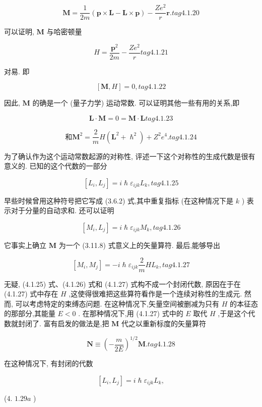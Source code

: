 $$
\mathbf{M} = \frac{1}{2m}\left( {\mathbf{p} \times \mathbf{L} - \mathbf{L} \times \mathbf{p}}\right) - \frac{Z{e}^{2}}{r}\mathbf{r}. tag{4. 1.20}
$$

可以证明, $\mathbf{M}$ 与哈密顿量

$$
H = \frac{{\mathbf{p}}^{2}}{2m} - \frac{Z{e}^{2}}{r} tag{4. 1.21}
$$

对易. 即

$$
\left\lbrack {\mathbf{M}, H}\right\rbrack = 0, tag{4. 1.22}
$$

因此, $\mathbf{M}$ 的确是一个 (量子力学) 运动常数. 可以证明其他一些有用的关系,即

$$
\mathbf{L} \cdot \mathbf{M} = 0 = \mathbf{M} \cdot \mathbf{L} tag{4. 1.23}
$$

$$
\text{和}{\mathbf{M}}^{2} = \frac{2}{m}H\left( {{\mathbf{L}}^{2} + {\hslash }^{2}}\right) + {Z}^{2}{e}^{4}\text{.} tag{4. 1.24}
$$

为了确认作为这个运动常数起源的对称性, 评述一下这个对称性的生成代数是很有意义的. 已知的这个代数的一部分

$$
\left\lbrack {{L}_{i},{L}_{j}}\right\rbrack = i\hslash {\varepsilon }_{ijk}{L}_{k}, tag{4. 1.25}
$$

早些时候曾用这种符号把它写成 (3.6.2) 式,其中重复指标 (在这种情况下是 $k$ ) 表示对于分量的自动求和. 还可以证明

$$
\left\lbrack {{M}_{i},{L}_{j}}\right\rbrack = i\hslash {\varepsilon }_{ijk}{M}_{k}, tag{4. 1.26}
$$

它事实上确立 $\mathbf{M}$ 为一个 (3.11.8) 式意义上的矢量算符. 最后,能够导出

$$
\left\lbrack {{M}_{i},{M}_{j}}\right\rbrack = - i\hslash {\varepsilon }_{ijk}\frac{2}{m}H{L}_{k}, tag{4. 1.27}
$$

无疑, (4.1.25) 式、(4.1.26) 式和 (4.1.27) 式构不成一个封闭代数, 原因在于在 (4.1.27) 式中存在 $H$ ,这使得很难把这些算符看作是一个连续对称性的生成元. 然而, 可以考虑特定的束缚态问题. 在这种情况下,矢量空间被删减为只有 $H$ 的本征态的那部分,其能量 $E < 0$ . 在那种情况下,用 (4.1.27) 式中的 $E$ 取代 $H$ ,于是这个代数就封闭了. 富有启发的做法是,把 $\mathbf{M}$ 代之以重新标度的矢量算符

$$
\mathbf{N} \equiv {\left( -\frac{m}{2E}\right) }^{1/2}\mathbf{M}. tag{4. 1.28}
$$

在这种情况下, 有封闭的代数

$$
\left\lbrack {{L}_{i},{L}_{j}}\right\rbrack = i\hslash {\varepsilon }_{ijk}{L}_{k},
$$

(4. ${1.29a}$ )

